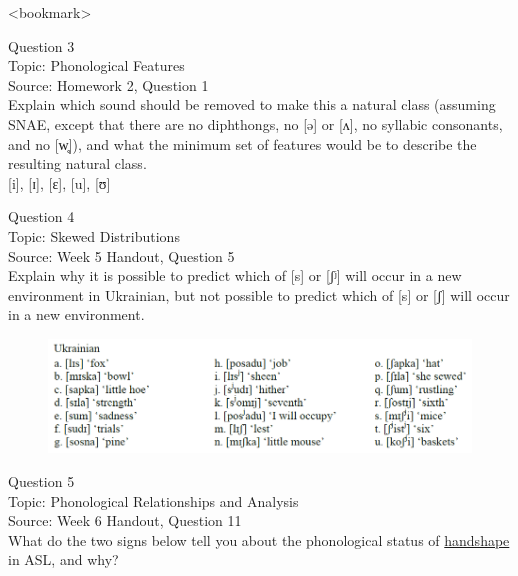 \documentclass[12pt]{article}
\begin{document}
<bookmark>


\newpage

{\large Question 3}\\

Topic: Phonological Features\\
Source: Homework 2, Question 1\\

Explain which sound should be removed to make this a natural class (assuming SNAE, except that there are no diphthongs, no [ə] or [ʌ], no syllabic consonants, and no [w̥]), and what the minimum set of features would be to describe the resulting natural class.\\

{[i]}, {[ɪ]}, {[ɛ]}, {[u]}, {[ʊ]}


\newpage

{\large Question 4}\\

Topic: Skewed Distributions\\
Source: Week 5 Handout, Question 5\\

Explain why it is possible to predict which of [s] or [ʃʲ] will occur in a new environment in Ukrainian, but not possible to predict which of [s] or [ʃ] will occur in a new environment.\\

\begin{figure}[H]
\includegraphics{../images/ukrainian.png}
\end{figure}

\newpage

{\large Question 5}\\

Topic: Phonological Relationships and Analysis\\
Source: Week 6 Handout, Question 11\\

What do the two signs below tell you about the phonological status of \underline{handshape} in ASL, and why?\\
\end{document}
